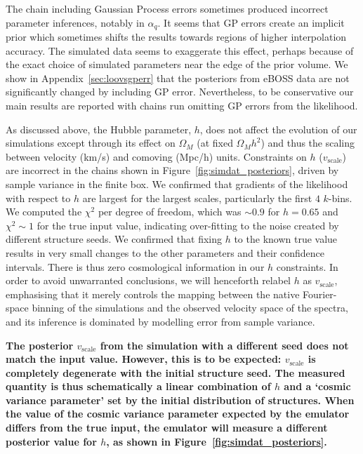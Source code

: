 The chain including Gaussian Process errors sometimes produced incorrect parameter inferences, notably in $\alpha_q$.
It seems that GP errors create an implicit prior which sometimes shifts the results towards regions of higher interpolation accuracy.
The simulated data seems to exaggerate this effect, perhaps because of the exact choice of simulated parameters near the edge of the prior volume.
We show in Appendix~\ref{sec:loovsgperr} that the posteriors from eBOSS data are not significantly changed by including GP error.
Nevertheless, to be conservative our main results are reported with chains run omitting GP errors from the likelihood.

As discussed above, the Hubble parameter, $h$, does not affect the evolution of our simulations except through its effect on $\Omega_M$ (at fixed $\Omega_M h^2$) and thus the scaling between velocity (km/s) and comoving (Mpc/h) units.
Constraints on $h$ ($v_\mathrm{scale}$) are incorrect in the chains shown in Figure~\ref{fig:simdat_posteriors}, driven by sample variance in the finite box.
We confirmed that gradients of the likelihood with respect to $h$ are largest for the largest scales, particularly the first $4$ $k$-bins.
We computed the $\chi^2$ per degree of freedom, which was $\sim 0.9$ for $h = 0.65$ and $\chi^2 \sim 1$ for the true input value, indicating over-fitting to the noise created by different structure seeds.
We confirmed that fixing $h$ to the known true value results in very small changes to the other parameters and their confidence intervals.
There is thus zero cosmological information in our $h$ constraints.
In order to avoid unwarranted conclusions, we will henceforth relabel $h$ as $v_\mathrm{scale}$, emphasising that it merely controls the mapping between the native Fourier-space binning of the simulations and the observed velocity space of the spectra, and its inference is dominated by modelling error from sample variance. 

\textbf{The posterior $v_\mathrm{scale}$ from the simulation with a different seed does not match the input value. However, this is to be expected: $v_\mathrm{scale}$ is completely degenerate with the initial structure seed. The measured quantity is thus schematically a linear combination of $h$ and a `cosmic variance parameter' set by the initial distribution of structures. When the value of the cosmic variance parameter expected by the emulator differs from the true input, the emulator will measure a different posterior value for $h$, as shown in Figure~\ref{fig:simdat_posteriors}.}